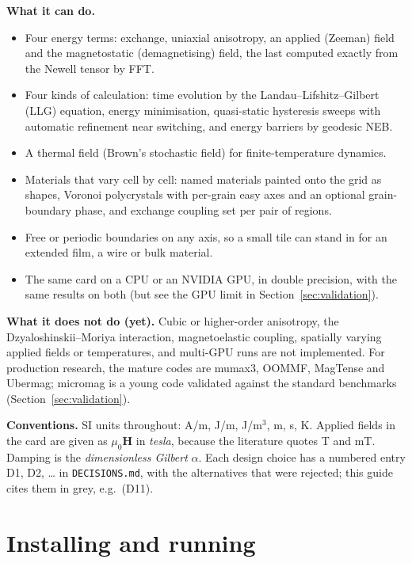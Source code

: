 \documentclass[10pt,a4paper]{article}
\newcommand{\code}[1]{\texttt{#1}}
\newcommand{\mo}{\mu_0}
\newcommand{\vH}{\mathbf{H}}
\newcommand{\dec}[1]{\textcolor{comment}{\small(#1)}}
\begin{document}
\textbf{What it can do.}
\begin{itemize}
  \item Four energy terms: exchange, uniaxial anisotropy, an applied (Zeeman) field and the magnetostatic (demagnetising)
        field, the last computed exactly from the Newell tensor by FFT.
  \item Four kinds of calculation: time evolution by the Landau--Lifshitz--Gilbert (LLG) equation, energy minimisation,
        quasi-static hysteresis sweeps with automatic refinement near switching, and energy barriers by geodesic NEB.
  \item A thermal field (Brown's stochastic field) for finite-temperature dynamics.
  \item Materials that vary cell by cell: named materials painted onto the grid as shapes, Voronoi polycrystals with
        per-grain easy axes and an optional grain-boundary phase, and exchange coupling set per pair of regions.
  \item Free or periodic boundaries on any axis, so a small tile can stand in for an extended film, a wire or bulk
        material.
  \item The same card on a CPU or an NVIDIA GPU, in double precision, with the same results on both (but see the GPU
        limit in Section~\ref{sec:validation}).
\end{itemize}

\textbf{What it does not do (yet).} Cubic or higher-order anisotropy, the Dzyaloshinskii--Moriya interaction,
magnetoelastic coupling, spatially varying applied fields or temperatures, and multi-GPU runs are not
implemented. For production research, the mature codes are mumax3, OOMMF, MagTense and Ubermag; micromag is a young code
validated against the standard benchmarks (Section~\ref{sec:validation}).

\textbf{Conventions.} SI units throughout: A/m, J/m, J/m$^3$, m, s, K. Applied fields in the card are given as
$\mo\vH$ in \emph{tesla}, because the literature quotes T and mT. Damping is the \emph{dimensionless Gilbert} $\alpha$.
Each design choice has a numbered entry D1, D2, \ldots{} in \code{DECISIONS.md}, with the alternatives that were
rejected; this guide cites them in grey, e.g.\ \dec{D11}.

\section{Installing and running}
\end{document}
